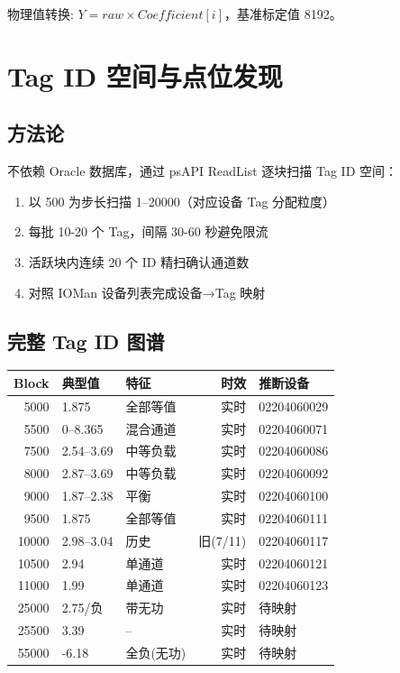 \documentclass[12pt,a4paper]{ctexart}
\begin{document}
物理值转换: $Y = raw \times Coefficient[i]$，基准标定值 8192。

\section{Tag ID 空间与点位发现}

\subsection{方法论}
不依赖 Oracle 数据库，通过 psAPI ReadList 逐块扫描 Tag ID 空间：

\begin{enumerate}[leftmargin=*]
  \item 以 500 为步长扫描 1--20000（对应设备 Tag 分配粒度）
  \item 每批 10-20 个 Tag，间隔 30-60 秒避免限流
  \item 活跃块内连续 20 个 ID 精扫确认通道数
  \item 对照 IOMan 设备列表完成设备→Tag 映射
\end{enumerate}

\subsection{完整 Tag ID 图谱}
\begin{table}[H]\centering
\begin{tabular}{rllrl}
\toprule
\textbf{Block} & \textbf{典型值} & \textbf{特征} & \textbf{时效} & \textbf{推断设备} \\
\midrule
5000 & 1.875 & 全部等值 & 实时 & 02204060029 \\
5500 & 0--8.365 & 混合通道 & 实时 & 02204060071 \\
7500 & 2.54--3.69 & 中等负载 & 实时 & 02204060086 \\
8000 & 2.87--3.69 & 中等负载 & 实时 & 02204060092 \\
9000 & 1.87--2.38 & 平衡 & 实时 & 02204060100 \\
9500 & 1.875 & 全部等值 & 实时 & 02204060111 \\
10000 & 2.98--3.04 & 历史 & 旧(7/11) & 02204060117 \\
10500 & 2.94 & 单通道 & 实时 & 02204060121 \\
11000 & 1.99 & 单通道 & 实时 & 02204060123 \\
25000 & 2.75/负 & 带无功 & 实时 & 待映射 \\
25500 & 3.39 & -- & 实时 & 待映射 \\
55000 & -6.18 & 全负(无功) & 实时 & 待映射 \\
\bottomrule
\end{tabular}
\end{table}
\end{document}
